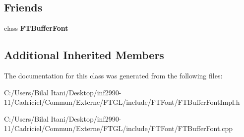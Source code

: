 \subsection*{Friends}
\begin{DoxyCompactItemize}
\item 
class {\bfseries F\+T\+Buffer\+Font}\hypertarget{class_f_t_buffer_font_impl_ab7dc21f40be33fee50c41b3ba3d49c73}{}\label{class_f_t_buffer_font_impl_ab7dc21f40be33fee50c41b3ba3d49c73}

\end{DoxyCompactItemize}
\subsection*{Additional Inherited Members}


The documentation for this class was generated from the following files\+:\begin{DoxyCompactItemize}
\item 
C\+:/\+Users/\+Bilal Itani/\+Desktop/inf2990-\/11/\+Cadriciel/\+Commun/\+Externe/\+F\+T\+G\+L/include/\+F\+T\+Font/F\+T\+Buffer\+Font\+Impl.\+h\item 
C\+:/\+Users/\+Bilal Itani/\+Desktop/inf2990-\/11/\+Cadriciel/\+Commun/\+Externe/\+F\+T\+G\+L/include/\+F\+T\+Font/F\+T\+Buffer\+Font.\+cpp\end{DoxyCompactItemize}
